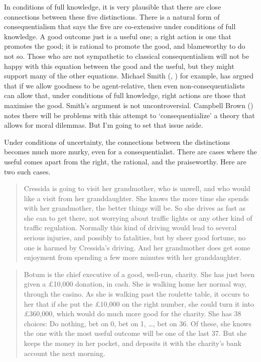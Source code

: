 \documentclass[
  10pt,
  letterpaper,
  twoside]{scrbook}
\begin{document}
In conditions of full knowledge, it is very plausible that there are
close connections between these five distinctions. There is a natural
form of consequentialism that says the five are co-extensive under
conditions of full knowledge. A good outcome just is a useful one; a
right action is one that promotes the good; it is rational to promote
the good, and blameworthy to do not so. Those who are not sympathetic to
classical consequentialism will not be happy with this equation between
the good and the useful, but they might support many of the other
equations. Michael Smith (,
) for example, has argued that if we allow
goodness to be agent-relative, then even non-consequentialists can allow
that, under conditions of full knowledge, right actions are those that
maximise the good. Smith's argument is not uncontroversial. Campbell
Brown () notes there will be
problems with this attempt to `consequentialize' a theory that allows
for moral dilemmas. But I'm going to set that issue aside.

Under conditions of uncertainty, the connections between the
distinctions becomes much more murky, even for a consequentialist. There
are cases where the useful comes apart from the right, the rational, and
the praiseworthy. Here are two such cases.

\begin{quote}
{Cressida} is going to visit her grandmother, who is unwell, and who
would like a visit from her granddaughter. She knows the more time she
spends with her grandmother, the better things will be. So she drives as
fast as she can to get there, not worrying about traffic lights or any
other kind of traffic regulation. Normally this kind of driving would
lead to several serious injuries, and possibly to fatalities, but by
sheer good fortune, no one is harmed by {Cressida}'s driving. And her
grandmother does get some enjoyment from spending a few more minutes
with her granddaughter.
\end{quote}

\begin{quote}
{Botum} is the chief executive of a good, well-run, charity. She has
just been given a £10,000 donation, in cash. She is walking home her
normal way, through the casino. As she is walking past the roulette
table, it occurs to her that if she put the £10,000 on the right number,
she could turn it into £360,000, which would do much more good for the
charity. She has 38 choices: Do nothing, bet on 0, bet on 1, \ldots, bet
on 36. Of these, she knows the one with the most useful outcome will be
one of the last 37. But she keeps the money in her pocket, and deposits
it with the charity's bank account the next morning.
\end{quote}
\end{document}
